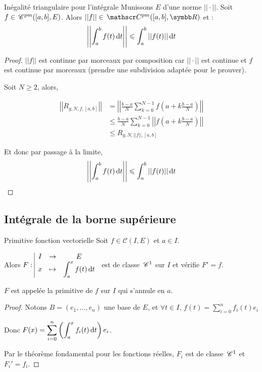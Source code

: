 \begin{theoreme}{Inégalité triangulaire pour l'intégrale}{}
    Munissons $E$ d'une norme $||\cdot||$. Soit $f \in \,\mathscr C^{pm}([a, b], E)$.
    Alors $||f|| \in \mc {pm}([a, b], \R)$ et :
    \[\left|\left| \int_a^b f(t) \,\mathrm{d}t \right|\right| \leqslant \int_a^b ||f(t)|| \,\mathrm{d}t\]
\end{theoreme}


\begin{proof}
    $||f||$ est continue par morceaux par composition car $||\cdot||$ est continue
    et $f$ est continue par morceaux (prendre une subdivision adaptée pour le prouver).

    Soit $N \geqslant 2$, alors,

    \begin{align*}
        \left|\left| R_{g, N, f, [a, b]} \right|\right| & = \left|\left| \frac{b-a}{N} \sum_{k=0}^{N-1} f\left( a + k \frac{b-a}{N} \right) \right|\right| \\
        & \leqslant \frac{b-a}{N} \sum_{k=0}^{N-1} \left|\left| f\left( a + k \frac{b-a}{N} \right) \right|\right| \\
        & \leqslant R_{g, N, ||f||, [a, b]}
    \end{align*}

    Et donc par passage à la limite, 
    \[\left|\left| \int_a^b f(t) \,\mathrm{d}t \right|\right| \leqslant \int_a^b ||f(t)|| \,\mathrm{d}t\]
\end{proof}

\subsection{Intégrale de la borne supérieure}

\begin{theoreme}{Primitive fonction vectorielle}{}
    Soit $f \in \mathscr C(I, E)$ et $a \in I$. 

    Alors $F: \space \begin{array}{|ccc} \displaystyle I & \to & \displaystyle E \\ \displaystyle x & \mapsto & \displaystyle \int_a^x f(t) \,\mathrm{d}t \end{array}$ est de classe $\,\mathscr C^{1}$ sur $I$ et 
    vérifie $F' = f$.

    $F$ est appelée la primitive de $f$ sur $I$ qui s'annule en $a$. 
\end{theoreme}


\begin{proof}
    Notons $B = (e_1, \ldots, e_n)$ une base de $E$, et $\forall t \in I, \, f(t) \displaystyle = \sum_{i = 0 }^{ n } f_i(t) e_i$

    Donc $\displaystyle F(x) = \sum_{i = 0 }^{ n } \left( \int_a^x f_i(t) \,\mathrm{d}t \right) e_i$.

    Par le théorème fondamental pour les fonctions réelles, $F_i$ est de classe $\,\mathscr C^{1}$ et $F_i' = f_i$.
\end{proof}


